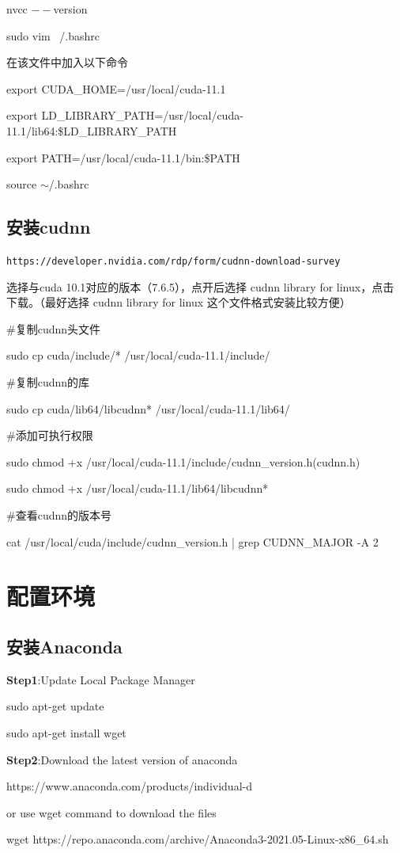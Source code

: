 \documentclass[11pt]{article}
\begin{document}
\begin{CJK}{UTF8}{gkai}
nvcc $--$version


sudo vim ~/.bashrc

在该文件中加入以下命令

export CUDA\_HOME=/usr/local/cuda-11.1

export LD\_LIBRARY\_PATH=/usr/local/cuda-11.1/lib64:\$LD\_LIBRARY\_PATH

export PATH=/usr/local/cuda-11.1/bin:\$PATH

source $\sim$/.bashrc

\subsection{安装cudnn}
\texttt{https://developer.nvidia.com/rdp/form/cudnn-download-survey}

选择与cuda 10.1对应的版本（7.6.5），点开后选择 cudnn library for linux，点击下载。（最好选择 cudnn library for linux 这个文件格式安装比较方便）

\#复制cudnn头文件

sudo cp cuda/include/* /usr/local/cuda-11.1/include/

\#复制cudnn的库

sudo cp cuda/lib64/libcudnn* /usr/local/cuda-11.1/lib64/

\#添加可执行权限

sudo chmod +x /usr/local/cuda-11.1/include/cudnn\_version.h(cudnn.h)

sudo chmod +x /usr/local/cuda-11.1/lib64/libcudnn*

\#查看cudnn的版本号

cat /usr/local/cuda/include/cudnn\_version.h | grep CUDNN\_MAJOR -A 2

\section{配置环境}
\subsection{安装Anaconda}
\textbf{Step1}:Update Local Package Manager

sudo apt-get update

sudo apt-get install wget

\textbf{Step2}:Download the latest version of anaconda

https://www.anaconda.com/products/individual-d

or use wget command to download the files

wget https://repo.anaconda.com/archive/Anaconda3-2021.05-Linux-x86\_64.sh


\end{CJK}
\end{document}
